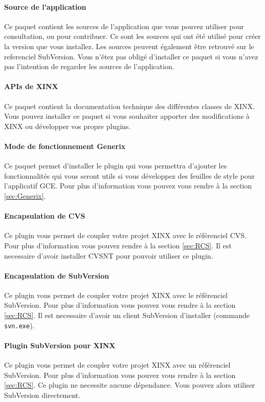 \documentclass[a4paper,10pt,twoside]{book}
\begin{document}
\paragraph{Source de l'application} Ce paquet contient les sources de l'application que vous pouvez utiliser pour consultation, ou pour contribuer. Ce sont les sources qui ont été utilisé pour créer la version que vous installez. Les sources peuvent également être retrouvé sur le referenciel SubVersion. Vous n'êtez pas obligé d'installer ce paquet si vous n'avez pas l'intention de regarder les sources de l'application.
\paragraph{APIs de XINX} Ce paquet contient la documentation technique des différentes classes de XINX. Vous pouvez installer ce paquet si vous souhaiter apporter des modifications à XINX ou développer vos propre plugins.
\paragraph{Mode de fonctionnement Generix} Ce paquet permet d'installer le plugin qui vous permettra d'ajouter les fonctionnalités qui vous seront utils si vous développez des feuilles de style pour l'applicatif GCE. Pour plus d'information vous pouvez vous rendre à la section \ref{sec:Generix}.
\paragraph{Encapsulation de CVS} Ce plugin vous permet de coupler votre projet XINX avec le référenciel CVS. Pour plus d'information vous pouvez rendre à la section \ref{sec:RCS}. Il est necessaire d'avoir installer CVSNT pour pouvoir utiliser ce plugin.
\paragraph{Encapsulation de SubVersion} Ce plugin vous permet de coupler votre projet XINX avec le référenciel SubVersion. Pour plus d'information vous pouvez vous rendre à la section \ref{sec:RCS}. Il est necessaire d'avoir un client SubVersion d'installer (commande \verb+svn.exe+).
\paragraph{Plugin SubVersion pour XINX} Ce plugin vous permet de coupler votre projet XINX avec un référenciel SubVersion. Pour plus d'information vous pouvez vous rendre à la section \ref{sec:RCS}. Ce plugin ne necessite aucune dépendance. Vous pouvez alors utiliser SubVersion directement.
\end{document}
